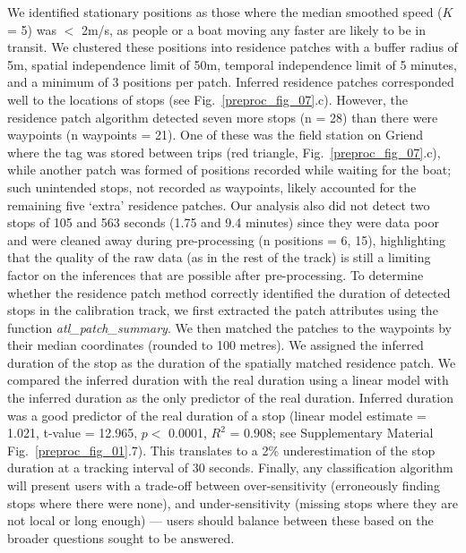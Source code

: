     We identified stationary positions as those where the median smoothed speed ($K$ = 5) was $<$ 2m/s, as people or a boat moving any faster are likely to be in transit.
    We clustered these positions into residence patches with a buffer radius of 5m, spatial independence limit of 50m, temporal independence limit of 5 minutes, and a minimum of 3 positions per patch.
    Inferred residence patches corresponded well to the locations of stops (see Fig.~\ref{preproc_fig_07}.c).
    However, the residence patch algorithm detected seven more stops (n = 28) than there were waypoints (n waypoints = 21).
    One of these was the field station on Griend where the tag was stored between trips (red triangle, Fig.~\ref{preproc_fig_07}.c), while another patch was formed of positions recorded while waiting for the boat; such unintended stops, not recorded as waypoints, likely accounted for the remaining five `extra' residence patches.
    Our analysis also did not detect two stops of 105 and 563 seconds (1.75 and 9.4 minutes) since they were data poor and were cleaned away during pre-processing (n positions = 6, 15), highlighting that the quality of the raw data (as in the rest of the track) is still a limiting factor on the inferences that are possible after pre-processing.
    To determine whether the residence patch method correctly identified the duration of detected stops in the calibration track, we first extracted the patch attributes using the function \textit{atl\_patch\_summary}.
    We then matched the patches to the waypoints by their median coordinates (rounded to 100 metres).
    We assigned the inferred duration of the stop as the duration of the spatially matched residence patch.
    We compared the inferred duration with the real duration using a linear model with the inferred duration as the only predictor of the real duration.
    Inferred duration was a good predictor of the real duration of a stop (linear model estimate = 1.021, t-value = 12.965, $p <$ 0.0001, $R^2$ = 0.908; see Supplementary Material Fig.~\ref{preproc_fig_01}.7).
    This translates to a 2\% underestimation of the stop duration at a tracking interval of 30 seconds.
    Finally, any classification algorithm will present users with a trade-off between over-sensitivity (erroneously finding stops where there were none), and under-sensitivity (missing stops where they are not local or long enough) --- users should balance between these based on the broader questions sought to be answered.


